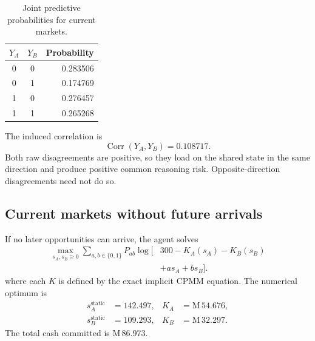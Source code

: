 \documentclass[journal,a4paper]{IEEEtran}
\begin{document}
\begin{table}[!t]
\centering
\caption{Joint predictive probabilities for current markets.}
\label{tab:joint}
\begin{tabular}{@{}ccr@{}}
\toprule
$Y_A$ & $Y_B$ & Probability\\
\midrule
0 & 0 & 0.283506\\
0 & 1 & 0.174769\\
1 & 0 & 0.276457\\
1 & 1 & 0.265268\\
\bottomrule
\end{tabular}
\end{table}

The induced correlation is
\begin{equation}
\operatorname{Corr}(Y_A,Y_B)=0.108717.
\end{equation}
Both raw disagreements are positive, so they load on the shared state in the same direction and produce positive common reasoning risk. Opposite-direction disagreements need not do so.

\subsection{Current markets without future arrivals}
If no later opportunities can arrive, the agent solves
\begin{equation}
\begin{split}
\max_{s_A,s_B\geq0}
\sum_{a,b\in\{0,1\}}P_{ab}
\log\!\bigl[&300-K_A(s_A)-K_B(s_B)\\
&+as_A+bs_B\bigr].
\end{split}
\label{eq:example-static}
\end{equation}
where each $K$ is defined by the exact implicit CPMM equation. The numerical optimum is
\begin{align}
s_A^{\mathrm{static}}&=142.497,
&K_A&=\text{M}\,54.676,\\
s_B^{\mathrm{static}}&=109.293,
&K_B&=\text{M}\,32.297.
\end{align}
The total cash committed is M\,86.973.
\end{document}
